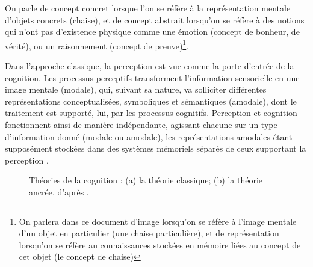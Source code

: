 On parle de concept concret lorsque l'on se réfère à la représentation mentale d'objets concrets (chaise), et de concept abstrait lorsqu'on se réfère à des notions qui n'ont pas d'existence physique comme une émotion (concept de bonheur, de vérité), ou un raisonnement (concept de preuve)\footnote{On parlera dans ce document d'image lorsqu'on se réfère à l'image mentale d'un objet en particulier (une chaise particulière), et de représentation lorsqu'on se réfère au connaissances stockées en mémoire liées au concept de cet objet (le concept de chaise)}.
 
Dans l'approche classique, la perception est vue comme la porte d'entrée de la cognition. Les processus perceptifs transforment l'information sensorielle en une image mentale (modale), qui, suivant sa nature, va solliciter différentes représentations conceptualisées, symboliques et sémantiques (amodale), dont le traitement est supporté, lui, par les processus cognitifs. Perception et cognition fonctionnent ainsi de manière indépendante, agissant chacune sur un type d'information donné (modale ou amodale), les représentations amodales étant supposément stockées dans des systèmes mémoriels séparés de ceux supportant la perception \citep{barsalou2008grounded}.

\begin{figure}[t]
         \myfloatalign
         \par
        \caption[Théories de la cognition.]{Théories de la cognition : (a) la théorie classique; (b) la théorie ancrée, d'après \citep{barsalou1999perceptions}.}
        \label{fig:appCog}
\end{figure}

